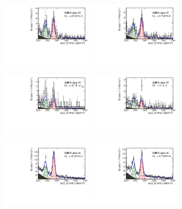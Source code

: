 \begin{figure}[h]
\centering
\includegraphics[height=!,width=0.4\textwidth]{figs/MassFit/signal_y15_phipi.pdf}
\includegraphics[height=!,width=0.4\textwidth]{figs/MassFit/signal_y15_KsK.pdf}

\includegraphics[height=!,width=0.4\textwidth]{figs/MassFit/signal_y15_KKpi_NR.pdf}
\includegraphics[height=!,width=0.4\textwidth]{figs/MassFit/signal_y15_pipipi.pdf}

\includegraphics[height=!,width=0.4\textwidth]{figs/MassFit/signal_y16_phipi.pdf}
\includegraphics[height=!,width=0.4\textwidth]{figs/MassFit/signal_y16_KsK.pdf}


\end{figure}
